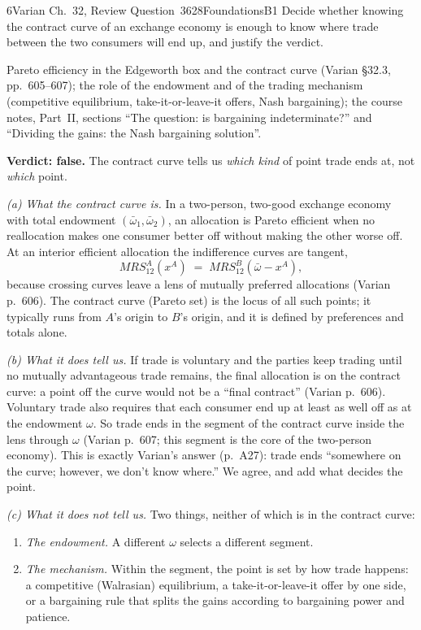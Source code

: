 \begin{exsol}{6}{Varian Ch.~32, Review Question~3}{628}{Foundations}{B1}
\asked Decide whether knowing the contract curve of an exchange economy is enough to know where
trade between the two consumers will end up, and justify the verdict.

\method Pareto efficiency in the Edgeworth box and the contract curve (Varian \S32.3,
pp.~605--607); the role of the endowment and of the trading mechanism (competitive equilibrium,
take-it-or-leave-it offers, Nash bargaining); the course notes, Part~II, sections ``The
question: is bargaining indeterminate?'' and ``Dividing the gains: the Nash bargaining solution''.

\solution
\textbf{Verdict: false.} The contract curve tells us \emph{which kind} of point trade ends at, not
\emph{which} point.

\emph{(a) What the contract curve is.} In a two-person, two-good exchange economy with total
endowment $(\bar\omega_1,\bar\omega_2)$, an allocation is Pareto efficient when no reallocation
makes one consumer better off without making the other worse off. At an interior efficient
allocation the indifference curves are tangent,
\[
  MRS^A_{12}(x^A) \;=\; MRS^B_{12}(\bar\omega - x^A),
\]
because crossing curves leave a lens of mutually preferred allocations (Varian p.~606). The
contract curve (Pareto set) is the locus of all such points; it typically runs from $A$'s origin
to $B$'s origin, and it is defined by preferences and totals alone.

\emph{(b) What it does tell us.} If trade is voluntary and the parties keep trading until no
mutually advantageous trade remains, the final allocation is on the contract curve: a point off
the curve would not be a ``final contract'' (Varian p.~606). Voluntary trade also requires that
each consumer end up at least as well off as at the endowment $\omega$. So trade ends in the
segment of the contract curve inside the lens through $\omega$ (Varian p.~607; this segment is the
core of the two-person economy). This is exactly Varian's answer (p.~A27): trade ends ``somewhere on
the curve; however, we don't know where.'' We agree, and add what decides the point.

\emph{(c) What it does not tell us.} Two things, neither of which is in the contract curve:
\begin{enumerate}[label=(\roman*)]
  \item \emph{The endowment.} A different $\omega$ selects a different segment.
  \item \emph{The mechanism.} Within the segment, the point is set by how trade happens: a
  competitive (Walrasian) equilibrium, a take-it-or-leave-it offer by one side, or a bargaining
  rule that splits the gains according to bargaining power and patience.
\end{enumerate}


\end{exsol}
